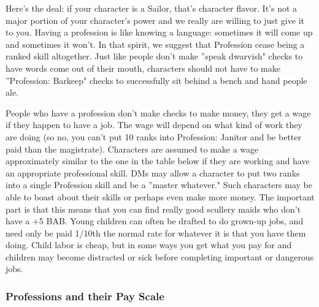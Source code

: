 Here's the deal: if your character is a Sailor, that's character flavor. It's not a major portion of your character's power and we really are willing to just give it to you. Having a profession is like knowing a language: sometimes it will come up and sometimes it won't. In that spirit, we suggest that Profession cease being a ranked skill altogether. Just like people don't make ''speak dwarvish" checks to have words come out of their mouth, characters should not have to make ''Profession: Barkeep" checks to successfully sit behind a bench and hand people ale.

People who have a profession don't make checks to make money, they get a wage if they happen to have a job. The wage will depend on what kind of work they are doing (so no, you can't put 10 ranks into Profession: Janitor and be better paid than the magistrate). Characters are assumed to make a wage approximately similar to the one in the table below if they are working and have an appropriate professional skill. DMs may allow a character to put two ranks into a single Profession skill and be a ''master whatever."  Such characters may be able to boast about their skills or perhaps even make more money. The important part is that this means that you can find really good scullery maids who don't have a +5 BAB. Young children can often be drafted to do grown-up jobs, and need only be paid 1/10th the normal rate for whatever it is that you have them doing. Child labor is cheap, but in some ways you get what you pay for and children may become distracted or sick before completing important or dangerous jobs.

\subsubsection{Professions and their Pay Scale}



